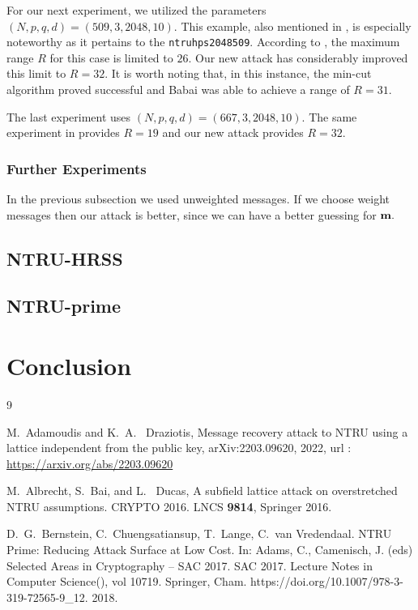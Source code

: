 \documentclass{amsart}
\numberwithin{equation}{section}
\begin{document}
{For our next experiment, we utilized the parameters $(N,p,q,d)=(509,3,2048,10)$. This example, also mentioned in \cite[example 5]{adam_draz}, is especially noteworthy as it pertains to the {\texttt{ntruhps2048509}}. According to \cite{adam_draz}, the maximum range $R$ for this case is limited to $26.$ Our new attack has considerably improved this limit to $R=32$. It is worth noting that, in this instance, the min-cut algorithm proved successful and Babai was able to achieve a range of $R=31$.

The last experiment uses $(N,p,q,d)=(667,3,2048,10).$ The same experiment in \cite{adam_draz} provides $R=19$ and our new attack provides $R=32.$ 
\subsubsection{Further Experiments} In the previous subsection we used unweighted messages. If we choose weight messages then our attack is better, since we can have a better  guessing for ${\bf m}.$ 
\subsection{NTRU-HRSS}
\subsection{NTRU-prime}

\section{Conclusion}


	\begin{thebibliography}{9}
	
 M.~Adamoudis and K.~A.~ Draziotis, Message recovery attack to NTRU using a lattice independent from the public key, arXiv:2203.09620, 2022, url : \url{https://arxiv.org/abs/2203.09620}


 M.~Albrecht, S.~Bai, and L.~ Ducas, A subfield lattice attack on overstretched NTRU assumptions. CRYPTO 2016. LNCS {\bf 9814}, Springer 2016.


 D.~G.~Bernstein, C.~Chuengsatiansup, T.~Lange, C.~van Vredendaal. NTRU Prime: Reducing Attack Surface at Low Cost. In: Adams, C., Camenisch, J. (eds) Selected Areas in Cryptography – SAC 2017. SAC 2017. Lecture Notes in Computer Science(), vol 10719. Springer, Cham. https://doi.org/10.1007/978-3-319-72565-9\_12. 2018.


\end{thebibliography}}
\end{document}
